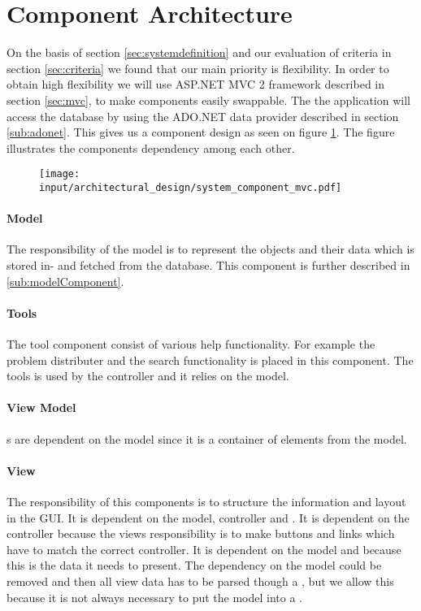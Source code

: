 \section{Component Architecture}
\label{sec:components}
On the basis of section \ref{sec:systemdefinition} and our evaluation of criteria in section \ref{sec:criteria} we found that our main priority is flexibility. 
In order to obtain high flexibility we will use ASP.NET MVC 2 framework described in section \ref{sec:mvc}, to make components easily swappable.
The the application will access the database by using the ADO.NET data provider described in section \ref{sub:adonet}. This gives us a component design as seen on figure \ref{fig:system_component_mvc}.
The figure illustrates the components dependency among each other. 

\begin{figure}[h]
	\centering
		\texttt{[image: input/architectural\_design/system\_component\_mvc.pdf]}
	\label{fig:system_component_mvc}
\end{figure}


\paragraph{Model}
The responsibility of the model is to represent the objects and their data which is stored in- and fetched from the database. This component is further described in \ref{sub:modelComponent}.


\paragraph{Tools}
The tool component consist of various help functionality. For example the problem distributer and the search functionality is placed in this component. The tools is used by the controller and it relies on the model. 

\paragraph{View Model}
\viewmodel{}s are dependent on the model since it is a container of elements from the model.

\paragraph{View} 
The responsibility of this components is to structure the information and layout in the GUI. 
It is dependent on the model, controller and \viewmodel{}. It is dependent on the controller because the views responsibility is to make buttons and links which have to match the correct controller. It is dependent on the model and \viewmodel{} because this is the data it needs to present. 
The dependency on the model could be removed and then all view data has to be parsed though a \viewmodel{}, but we allow this because it is not always necessary to put the model into a \viewmodel{}. 

